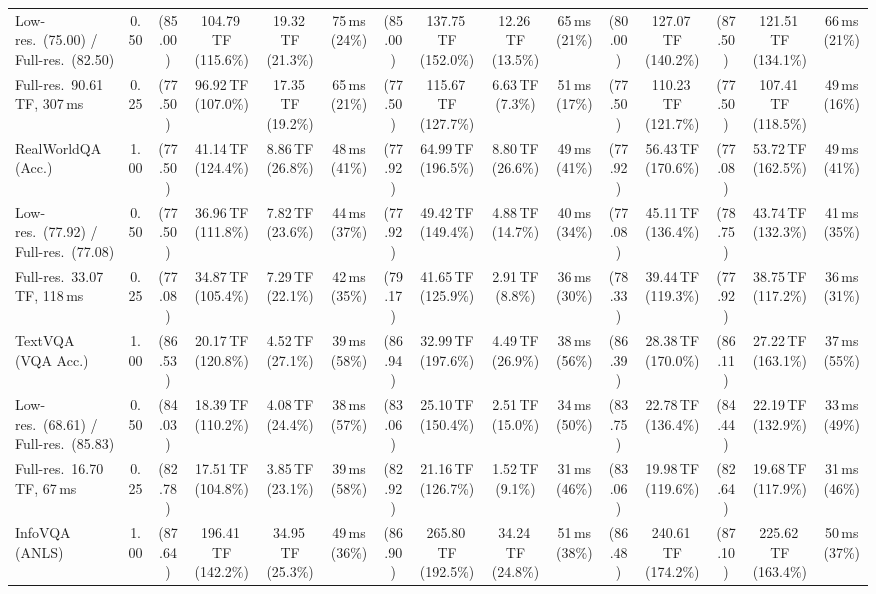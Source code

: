 \begin{table}[t]
{\begin{tabular}{l c | c c c c | c c c c | c c | c c c}
{\footnotesize Low-res.\ (75.00) / Full-res.\ (82.50)} & 0.50 & (85.00) & 104.79\,TF (115.6\%) & 19.32\,TF (21.3\%) & 75\,ms (24\%) & (85.00) & 137.75\,TF (152.0\%) & 12.26\,TF (13.5\%) & 65\,ms (21\%) & (80.00) & 127.07\,TF (140.2\%) & (87.50) & 121.51\,TF (134.1\%) & 66\,ms (21\%) \\
{\footnotesize Full-res.\ 90.61\,TF, 307\,ms} & 0.25 & (77.50) & 96.92\,TF (107.0\%) & 17.35\,TF (19.2\%) & 65\,ms (21\%) & (77.50) & 115.67\,TF (127.7\%) & 6.63\,TF (7.3\%) & 51\,ms (17\%) & (77.50) & 110.23\,TF (121.7\%) & (77.50) & 107.41\,TF (118.5\%) & 49\,ms (16\%) \\
\cmidrule(lr){1-15}
RealWorldQA (Acc.) & 1.00 & (77.50) & 41.14\,TF (124.4\%) & 8.86\,TF (26.8\%) & 48\,ms (41\%) & (77.92) & 64.99\,TF (196.5\%) & 8.80\,TF (26.6\%) & 49\,ms (41\%) & (77.92) & 56.43\,TF (170.6\%) & (77.08) & 53.72\,TF (162.5\%) & 49\,ms (41\%) \\
{\footnotesize Low-res.\ (77.92) / Full-res.\ (77.08)} & 0.50 & (77.50) & 36.96\,TF (111.8\%) & 7.82\,TF (23.6\%) & 44\,ms (37\%) & (77.92) & 49.42\,TF (149.4\%) & 4.88\,TF (14.7\%) & 40\,ms (34\%) & (77.08) & 45.11\,TF (136.4\%) & (78.75) & 43.74\,TF (132.3\%) & 41\,ms (35\%) \\
{\footnotesize Full-res.\ 33.07\,TF, 118\,ms} & 0.25 & (77.08) & 34.87\,TF (105.4\%) & 7.29\,TF (22.1\%) & 42\,ms (35\%) & (79.17) & 41.65\,TF (125.9\%) & 2.91\,TF (8.8\%) & 36\,ms (30\%) & (78.33) & 39.44\,TF (119.3\%) & (77.92) & 38.75\,TF (117.2\%) & 36\,ms (31\%) \\
\cmidrule(lr){1-15}
TextVQA (VQA Acc.) & 1.00 & (86.53) & 20.17\,TF (120.8\%) & 4.52\,TF (27.1\%) & 39\,ms (58\%) & (86.94) & 32.99\,TF (197.6\%) & 4.49\,TF (26.9\%) & 38\,ms (56\%) & (86.39) & 28.38\,TF (170.0\%) & (86.11) & 27.22\,TF (163.1\%) & 37\,ms (55\%) \\
{\footnotesize Low-res.\ (68.61) / Full-res.\ (85.83)} & 0.50 & (84.03) & 18.39\,TF (110.2\%) & 4.08\,TF (24.4\%) & 38\,ms (57\%) & (83.06) & 25.10\,TF (150.4\%) & 2.51\,TF (15.0\%) & 34\,ms (50\%) & (83.75) & 22.78\,TF (136.4\%) & (84.44) & 22.19\,TF (132.9\%) & 33\,ms (49\%) \\
{\footnotesize Full-res.\ 16.70\,TF, 67\,ms} & 0.25 & (82.78) & 17.51\,TF (104.8\%) & 3.85\,TF (23.1\%) & 39\,ms (58\%) & (82.92) & 21.16\,TF (126.7\%) & 1.52\,TF (9.1\%) & 31\,ms (46\%) & (83.06) & 19.98\,TF (119.6\%) & (82.64) & 19.68\,TF (117.9\%) & 31\,ms (46\%) \\
\cmidrule(lr){1-15}
InfoVQA (ANLS) & 1.00 & (87.64) & 196.41\,TF (142.2\%) & 34.95\,TF (25.3\%) & 49\,ms (36\%) & (86.90) & 265.80\,TF (192.5\%) & 34.24\,TF (24.8\%) & 51\,ms (38\%) & (86.48) & 240.61\,TF (174.2\%) & (87.10) & 225.62\,TF (163.4\%) & 50\,ms (37\%) \\

\end{tabular}}
\end{table}
